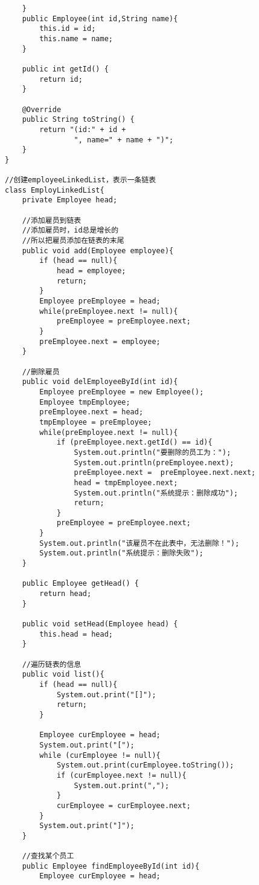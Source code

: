 \documentclass[a4paper]{report}
\begin{document}
\begin{lstlisting}
    }
    public Employee(int id,String name){
        this.id = id;
        this.name = name;
    }

    public int getId() {
        return id;
    }

    @Override
    public String toString() {
        return "(id:" + id +
                ", name=" + name + ")";
    }
}

//创建employeeLinkedList，表示一条链表
class EmployLinkedList{
    private Employee head;

    //添加雇员到链表
    //添加雇员时，id总是增长的
    //所以把雇员添加在链表的末尾
    public void add(Employee employee){
        if (head == null){
            head = employee;
            return;
        }
        Employee preEmployee = head;
        while(preEmployee.next != null){
            preEmployee = preEmployee.next;
        }
        preEmployee.next = employee;
    }

    //删除雇员
    public void delEmployeeById(int id){
        Employee preEmployee = new Employee();
        Employee tmpEmployee;
        preEmployee.next = head;
        tmpEmployee = preEmployee;
        while(preEmployee.next != null){
            if (preEmployee.next.getId() == id){
                System.out.println("要删除的员工为：");
                System.out.println(preEmployee.next);
                preEmployee.next =  preEmployee.next.next;
                head = tmpEmployee.next;
                System.out.println("系统提示：删除成功");
                return;
            }
            preEmployee = preEmployee.next;
        }
        System.out.println("该雇员不在此表中，无法删除！");
        System.out.println("系统提示：删除失败");
    }

    public Employee getHead() {
        return head;
    }

    public void setHead(Employee head) {
        this.head = head;
    }

    //遍历链表的信息
    public void list(){
        if (head == null){
            System.out.print("[]");
            return;
        }

        Employee curEmployee = head;
        System.out.print("[");
        while (curEmployee != null){
            System.out.print(curEmployee.toString());
            if (curEmployee.next != null){
                System.out.print(",");
            }
            curEmployee = curEmployee.next;
        }
        System.out.print("]");
    }

    //查找某个员工
    public Employee findEmployeeById(int id){
        Employee curEmployee = head;


\end{lstlisting}
\end{document}
